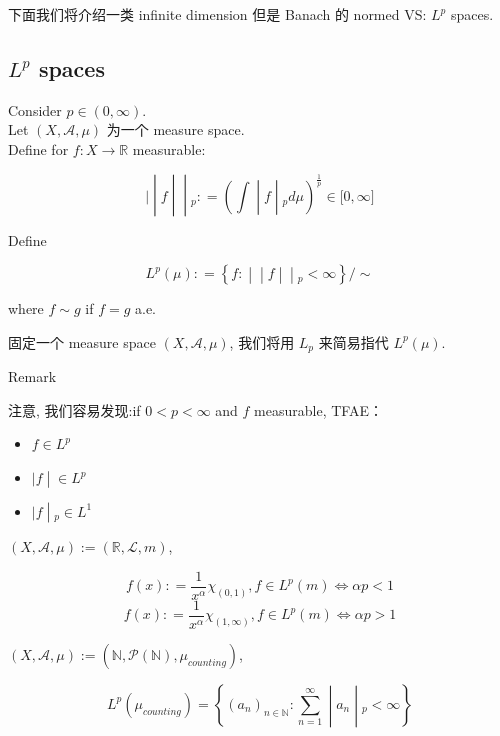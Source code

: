 下面我们将介绍一类 infinite dimension 但是 Banach 的 normed VS: \(L^{p}\) spaces.

\subsection{\texorpdfstring{\(L^{p}\) spaces}{L\^{}\{p\} spaces}}\label{lp-spaces}

\begin{definition}{}

Consider \(p \in (0,\infty)\).\\
Let \((X,\mathcal{A},\mu)\) 为一个 measure space.\\
Define for \(f:X\rightarrow\mathbb{R}\) measurable:

\[\left. | \middle| f \middle| \middle| {}_{p}: = (\int \middle| f \middle| {}_{p} d\mu)^{\frac{1}{p}} \in \lbrack 0,\infty\rbrack \right.\]

Define

\[L^{p}(\mu): = \left\{ f: \middle| \middle| f \middle| \middle| {}_{p} < \infty \right\}/ \sim\]

where \(f \sim g\) if \(f = g\) a.e.

\end{definition}

固定一个 measure space \((X,\mathcal{A},\mu)\), 我们将用 \(L_{p}\) 来简易指代 \(L^{p}(\mu)\).\\

\begin{qlremark}{Remark}

注意, 我们容易发现:if \(0 < p < \infty\) and \(f\) measurable, TFAE：

\begin{itemize}
\item
  \(f \in L^{p}\)
\item
  \(\left. |f \middle| \in L^{p} \right.\)
\item
  \(\left. |f \middle| {}_{p} \in L^{1} \right.\)
\end{itemize}

\end{qlremark}

\begin{example}

\((X,\mathcal{A},\mu) := (\mathbb{R},\mathcal{L},m)\),

\[f(x): = \frac{1}{x^{\alpha}}\chi_{(0,1)}, f \in L^{p}(m)\Leftrightarrow\alpha p < 1\]\[f(x): = \frac{1}{x^{\alpha}}\chi_{(1,\infty)}, f \in L^{p}(m)\Leftrightarrow\alpha p > 1\]

\((X,\mathcal{A},\mu) := (\mathbb{N},\mathcal{P}(\mathbb{N}),\mu_{counting})\),

\[L^{p}(\mu_{counting}) = \left\{ (a_{n})_{n \in \mathbb{N}}:\sum\limits_{n = 1}^{\infty} \middle| a_{n} \middle| {}_{p} < \infty \right\}\]

\end{example}

